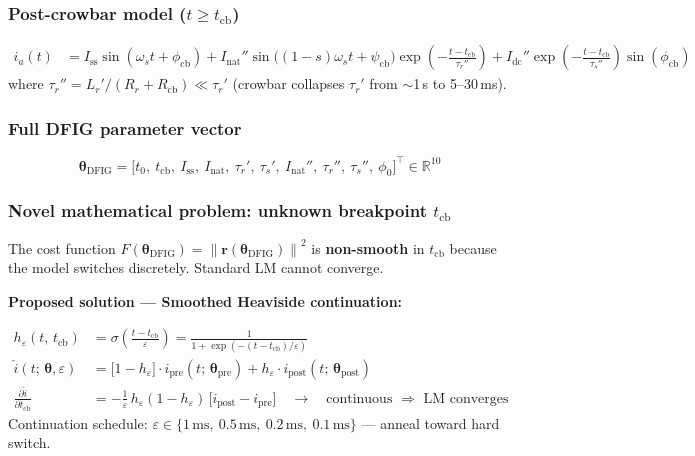\documentclass[12pt, a4paper]{report}
\newcommand{\vect}[1]{\boldsymbol{#1}}
\newcommand{\norm}[1]{\left\lVert#1\right\rVert}
\begin{document}
\subsubsection{Post-crowbar model ($t \ge t_\mathrm{cb}$)}

\begin{tcolorbox}[mathbox]
\begin{align}
  i_a(t) &= I_\mathrm{ss}\sin(\omega_s t + \phi_\mathrm{cb})
           + I_\mathrm{nat}''\sin\!\bigl((1-s)\omega_s t + \psi_\mathrm{cb}\bigr)\exp\!\left(-\frac{t-t_\mathrm{cb}}{\tau_r''}\right)
           + I_\mathrm{dc}''\exp\!\left(-\frac{t-t_\mathrm{cb}}{\tau_s''}\right)\sin(\phi_\mathrm{cb})
\end{align}
where $\tau_r'' = L_r'/(R_r + R_\mathrm{cb}) \ll \tau_r'$ (crowbar collapses $\tau_r'$ from $\sim$1\,s to 5--30\,ms).
\end{tcolorbox}

\subsubsection{Full DFIG parameter vector}

\begin{equation}
  \vect{\theta}_\mathrm{DFIG} = \bigl[t_0,\ t_\mathrm{cb},\ I_\mathrm{ss},\ I_\mathrm{nat},\ \tau_r',\ \tau_s',\ I_\mathrm{nat}'',\ \tau_r'',\ \tau_s'',\ \phi_0\bigr]^\top \in \mathbb{R}^{10}
\end{equation}

\subsubsection{Novel mathematical problem: unknown breakpoint $t_\mathrm{cb}$}

The cost function $F(\vect{\theta}_\mathrm{DFIG}) = \norm{\vect{r}(\vect{\theta}_\mathrm{DFIG})}^2$ is \textbf{non-smooth} in $t_\mathrm{cb}$ because the model switches discretely. Standard LM cannot converge.

\textbf{Proposed solution — Smoothed Heaviside continuation:}

\begin{tcolorbox}[mathbox]
\begin{align}
  h_\varepsilon(t,\, t_\mathrm{cb}) &= \sigma\!\left(\frac{t - t_\mathrm{cb}}{\varepsilon}\right)
      = \frac{1}{1 + \exp(-(t-t_\mathrm{cb})/\varepsilon)} \label{eq:heaviside}\\[6pt]
  \hat{i}(t;\,\vect{\theta},\varepsilon) &= \bigl[1-h_\varepsilon\bigr]\cdot i_\mathrm{pre}(t;\,\vect{\theta}_\mathrm{pre})
                                          + h_\varepsilon \cdot i_\mathrm{post}(t;\,\vect{\theta}_\mathrm{post}) \label{eq:composite}\\[6pt]
  \frac{\partial \hat{i}}{\partial t_\mathrm{cb}} &= -\frac{1}{\varepsilon}\,h_\varepsilon(1-h_\varepsilon)\,
      \bigl[i_\mathrm{post} - i_\mathrm{pre}\bigr]
      \quad\longrightarrow\quad \text{continuous }\Rightarrow\text{ LM converges} \label{eq:jacobian_tcb}
\end{align}
Continuation schedule: $\varepsilon \in \{1\,\mathrm{ms},\ 0.5\,\mathrm{ms},\ 0.2\,\mathrm{ms},\ 0.1\,\mathrm{ms}\}$ — anneal toward hard switch.
\end{tcolorbox}
\end{document}
